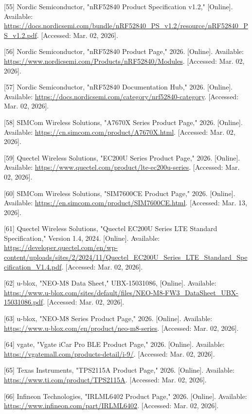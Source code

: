 \documentclass[a4paper]{extarticle}
\begin{document}
{[}55{]} Nordic Semiconductor, "nRF52840 Product Specification v1.2,"
{[}Online{]}. Available:
\url{https://docs.nordicsemi.com/bundle/nRF52840_PS_v1.2/resource/nRF52840_PS_v1.2.pdf}.
{[}Accessed: Mar. 02, 2026{]}.

{[}56{]} Nordic Semiconductor, "nRF52840 Product Page," 2026.
{[}Online{]}. Available:
\url{https://www.nordicsemi.com/Products/nRF52840/Modules}. {[}Accessed:
Mar. 02, 2026{]}.

{[}57{]} Nordic Semiconductor, "nRF52840 Documentation Hub," 2026.
{[}Online{]}. Available:
\url{https://docs.nordicsemi.com/category/nrf52840-category}.
{[}Accessed: Mar. 02, 2026{]}.

{[}58{]} SIMCom Wireless Solutions, "A7670X Series Product Page," 2026.
{[}Online{]}. Available:
\url{https://cn.simcom.com/product/A7670X.html}. {[}Accessed: Mar. 02,
2026{]}.

{[}59{]} Quectel Wireless Solutions, "EC200U Series Product Page," 2026.
{[}Online{]}. Available:
\url{https://www.quectel.com/product/lte-ec200u-series}. {[}Accessed:
Mar. 02, 2026{]}.

{[}60{]} SIMCom Wireless Solutions, "SIM7600CE Product Page," 2026.
{[}Online{]}. Available:
\url{https://en.simcom.com/product/SIM7600CE.html}. {[}Accessed: Mar.
13, 2026{]}.

{[}61{]} Quectel Wireless Solutions, "Quectel EC200U Series LTE Standard
Specification," Version 1.4, 2024. {[}Online{]}. Available:
\url{https://developer.quectel.com/en/wp-content/uploads/sites/2/2024/11/Quectel_EC200U_Series_LTE_Standard_Specification_V1.4.pdf}.
{[}Accessed: Mar. 02, 2026{]}.

{[}62{]} u-blox, "NEO-M8 Data Sheet," UBX-15031086, {[}Online{]}.
Available:
\url{https://www.u-blox.com/sites/default/files/NEO-M8-FW3_DataSheet_UBX-15031086.pdf}.
{[}Accessed: Mar. 02, 2026{]}.

{[}63{]} u-blox, "NEO-M8 Series Product Page," 2026. {[}Online{]}.
Available: \url{https://www.u-blox.com/en/product/neo-m8-series}.
{[}Accessed: Mar. 02, 2026{]}.

{[}64{]} vgate, "Vgate iCar Pro BLE Product Page," 2026. {[}Online{]}.
Available: \url{https://vgatemall.com/products-detail/i-9/}.
{[}Accessed: Mar. 02, 2026{]}.

{[}65{]} Texas Instruments, "TPS2115A Product Page," 2026. {[}Online{]}.
Available: \url{https://www.ti.com/product/TPS2115A}. {[}Accessed: Mar.
02, 2026{]}.

{[}66{]} Infineon Technologies, "IRLML6402 Product Page," 2026.
{[}Online{]}. Available: \url{https://www.infineon.com/part/IRLML6402}.
{[}Accessed: Mar. 02, 2026{]}.
\end{document}
